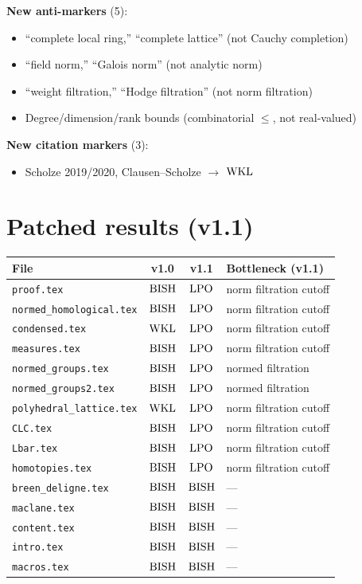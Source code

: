 \documentclass[11pt,a4paper]{article}
\theoremstyle{plain}
\theoremstyle{definition}
\newcommand{\BISH}{\textup{BISH}}
\newcommand{\WKL}{\textup{WKL}}
\newcommand{\LPO}{\textup{LPO}}
\begin{document}
\noindent\textbf{New anti-markers} (5):

\begin{itemize}[nosep]
\item ``complete local ring,'' ``complete lattice'' (not Cauchy completion)
\item ``field norm,'' ``Galois norm'' (not analytic norm)
\item ``weight filtration,'' ``Hodge filtration'' (not norm filtration)
\item Degree/dimension/rank bounds (combinatorial $\leq$, not real-valued)
\end{itemize}

\noindent\textbf{New citation markers} (3):

\begin{itemize}[nosep]
\item Scholze 2019/2020, Clausen--Scholze $\to$ $\WKL$
\end{itemize}

\section{Patched results (v1.1)}\label{sec:patched-results}

\begin{center}
\begin{tabular}{lccl}
\toprule
\textbf{File} & \textbf{v1.0} & \textbf{v1.1} & \textbf{Bottleneck (v1.1)} \\
\midrule
\texttt{proof.tex}              & $\BISH$ & $\LPO$ & norm filtration cutoff \\
\texttt{normed\_homological.tex} & $\BISH$ & $\LPO$ & norm filtration cutoff \\
\texttt{condensed.tex}          & $\WKL$  & $\LPO$ & norm filtration cutoff \\
\texttt{measures.tex}           & $\BISH$ & $\LPO$ & norm filtration cutoff \\
\texttt{normed\_groups.tex}     & $\BISH$ & $\LPO$ & normed filtration \\
\texttt{normed\_groups2.tex}    & $\BISH$ & $\LPO$ & normed filtration \\
\texttt{polyhedral\_lattice.tex}& $\WKL$  & $\LPO$ & norm filtration cutoff \\
\texttt{CLC.tex}                & $\BISH$ & $\LPO$ & norm filtration cutoff \\
\texttt{Lbar.tex}               & $\BISH$ & $\LPO$ & norm filtration cutoff \\
\texttt{homotopies.tex}         & $\BISH$ & $\LPO$ & norm filtration cutoff \\
\texttt{breen\_deligne.tex}     & $\BISH$ & $\BISH$ & --- \\
\texttt{maclane.tex}            & $\BISH$ & $\BISH$ & --- \\
\texttt{content.tex}            & $\BISH$ & $\BISH$ & --- \\
\texttt{intro.tex}              & $\BISH$ & $\BISH$ & --- \\
\texttt{macros.tex}             & $\BISH$ & $\BISH$ & --- \\
\bottomrule
\end{tabular}
\end{center}
\end{document}
